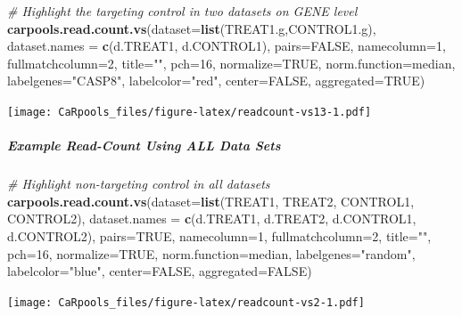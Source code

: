\documentclass[]{article}
\newenvironment{Shaded}{\begin{snugshade}}{\end{snugshade}}
\newcommand{\KeywordTok}[1]{\textcolor[rgb]{0.13,0.29,0.53}{\textbf{{#1}}}}
\newcommand{\DataTypeTok}[1]{\textcolor[rgb]{0.13,0.29,0.53}{{#1}}}
\newcommand{\DecValTok}[1]{\textcolor[rgb]{0.00,0.00,0.81}{{#1}}}
\newcommand{\StringTok}[1]{\textcolor[rgb]{0.31,0.60,0.02}{{#1}}}
\newcommand{\CommentTok}[1]{\textcolor[rgb]{0.56,0.35,0.01}{\textit{{#1}}}}
\newcommand{\OtherTok}[1]{\textcolor[rgb]{0.56,0.35,0.01}{{#1}}}
\newcommand{\NormalTok}[1]{{#1}}
\let\oldsubparagraph\subparagraph
\renewcommand{\subparagraph}[1]{\oldsubparagraph{#1}\mbox{}}
\begin{document}
\begin{Shaded}
\begin{Highlighting}[]
\CommentTok{# Highlight the targeting control in two datasets on GENE level}
\KeywordTok{carpools.read.count.vs}\NormalTok{(}\DataTypeTok{dataset=}\KeywordTok{list}\NormalTok{(TREAT1.g,CONTROL1.g), }\DataTypeTok{dataset.names =} \KeywordTok{c}\NormalTok{(d.TREAT1, d.CONTROL1),}
  \DataTypeTok{pairs=}\OtherTok{FALSE}\NormalTok{, }\DataTypeTok{namecolumn=}\DecValTok{1}\NormalTok{, }\DataTypeTok{fullmatchcolumn=}\DecValTok{2}\NormalTok{, }\DataTypeTok{title=}\StringTok{""}\NormalTok{, }\DataTypeTok{pch=}\DecValTok{16}\NormalTok{,}
  \DataTypeTok{normalize=}\OtherTok{TRUE}\NormalTok{, }\DataTypeTok{norm.function=}\NormalTok{median, }\DataTypeTok{labelgenes=}\StringTok{"CASP8"}\NormalTok{, }\DataTypeTok{labelcolor=}\StringTok{"red"}\NormalTok{,}
  \DataTypeTok{center=}\OtherTok{FALSE}\NormalTok{, }\DataTypeTok{aggregated=}\OtherTok{TRUE}\NormalTok{)}
\end{Highlighting}
\end{Shaded}

\texttt{[image: CaRpools\_files/figure-latex/readcount-vs13-1.pdf]}

\subparagraph{Example Read-Count Using ALL Data
Sets}\label{example-read-count-using-all-data-sets}

\begin{Shaded}
\begin{Highlighting}[]
\CommentTok{# Highlight non-targeting control in all datasets}
\KeywordTok{carpools.read.count.vs}\NormalTok{(}\DataTypeTok{dataset=}\KeywordTok{list}\NormalTok{(TREAT1, TREAT2, CONTROL1, CONTROL2),}
  \DataTypeTok{dataset.names =} \KeywordTok{c}\NormalTok{(d.TREAT1, d.TREAT2, d.CONTROL1, d.CONTROL2), }\DataTypeTok{pairs=}\OtherTok{TRUE}\NormalTok{, }\DataTypeTok{namecolumn=}\DecValTok{1}\NormalTok{,}
  \DataTypeTok{fullmatchcolumn=}\DecValTok{2}\NormalTok{, }\DataTypeTok{title=}\StringTok{""}\NormalTok{, }\DataTypeTok{pch=}\DecValTok{16}\NormalTok{, }\DataTypeTok{normalize=}\OtherTok{TRUE}\NormalTok{, }\DataTypeTok{norm.function=}\NormalTok{median,}
  \DataTypeTok{labelgenes=}\StringTok{"random"}\NormalTok{, }\DataTypeTok{labelcolor=}\StringTok{"blue"}\NormalTok{, }\DataTypeTok{center=}\OtherTok{FALSE}\NormalTok{, }\DataTypeTok{aggregated=}\OtherTok{FALSE}\NormalTok{)}
\end{Highlighting}
\end{Shaded}

\texttt{[image: CaRpools\_files/figure-latex/readcount-vs2-1.pdf]}
\end{document}

